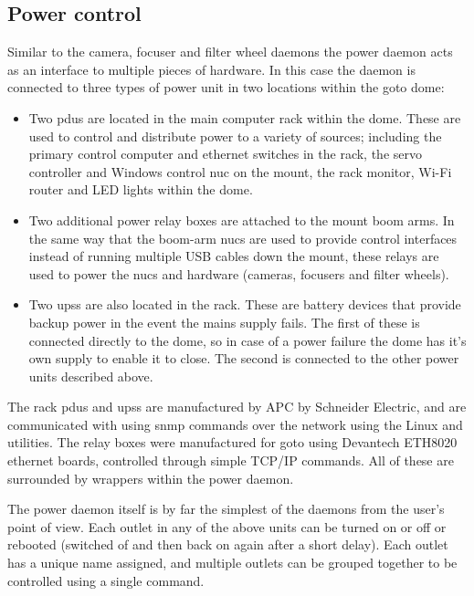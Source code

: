 \begin{colsection}
\begin{colsection}
\end{colsection}


\subsection{Power control}
\label{sec:power}
\begin{colsection}

Similar to the camera, focuser and filter wheel daemons the power daemon acts as an interface to multiple pieces of hardware. In this case the daemon is connected to three types of power unit in two locations within the \gls{goto} dome:

\begin{itemize}
    \item Two \glspl{pdu} are located in the main computer rack within the dome. These are used to control and distribute power to a variety of sources; including the primary control computer and ethernet switches in the rack, the servo controller and Windows control \gls{nuc} on the mount, the rack monitor, Wi-Fi router and LED lights within the dome.
    \item Two additional power relay boxes are attached to the mount boom arms. In the same way that the boom-arm \glspl{nuc} are used to provide control interfaces instead of running multiple USB cables down the mount, these relays are used to power the \glspl{nuc} and hardware (cameras, focusers and filter wheels).
    \item Two \glspl{ups} are also located in the rack. These are battery devices that provide backup power in the event the mains supply fails. The first of these is connected directly to the dome, so in case of a power failure the dome has it's own supply to enable it to close. The second is connected to the other power units described above.
\end{itemize}

The rack \glspl{pdu} and \glspl{ups} are manufactured by APC by Schneider Electric, and are communicated with using \gls{snmp} commands over the network using the Linux  and  utilities. The relay boxes were manufactured for \gls{goto} using Devantech ETH8020 ethernet boards, controlled through simple TCP/IP commands. All of these are surrounded by  wrappers within the power daemon.

The power daemon itself is by far the simplest of the daemons from the user's point of view. Each outlet in any of the above units can be turned on or off or rebooted (switched of and then back on again after a short delay). Each outlet has a unique name assigned, and multiple outlets can be grouped together to be controlled using a single command.

\end{colsection}


\end{colsection}

